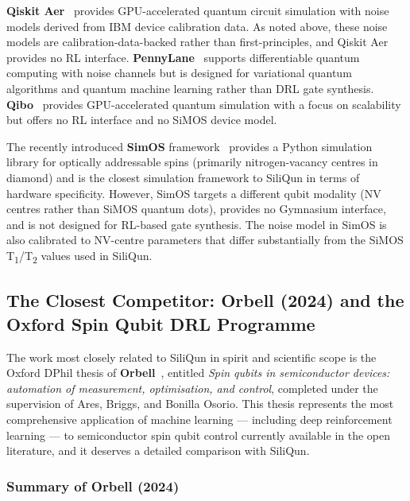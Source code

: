 \textbf{Qiskit Aer}~\cite{Qiskit2024} provides GPU-accelerated quantum
circuit simulation with noise models derived from IBM device calibration
data. As noted above, these noise models are calibration-data-backed rather
than first-principles, and Qiskit Aer provides no RL interface.
\textbf{PennyLane}~\cite{Bergholm2018} supports differentiable quantum
computing with noise channels but is designed for variational quantum
algorithms and quantum machine learning rather than DRL gate synthesis.
\textbf{Qibo}~\cite{Efthymiou2021} provides GPU-accelerated quantum
simulation with a focus on scalability but offers no RL interface and no
SiMOS device model.

The recently introduced \textbf{SimOS} framework~\cite{SimOS2025} provides
a Python simulation library for optically addressable spins (primarily
nitrogen-vacancy centres in diamond) and is the closest simulation
framework to SiliQun in terms of hardware specificity. However, SimOS
targets a different qubit modality (NV centres rather than SiMOS quantum
dots), provides no Gymnasium interface, and is not designed for RL-based
gate synthesis. The noise model in SimOS is also calibrated to NV-centre
parameters that differ substantially from the SiMOS T\textsubscript{1}/T\textsubscript{2}
values used in SiliQun.

\subsection{The Closest Competitor: Orbell (2024) and the Oxford Spin Qubit DRL Programme}
\label{sec:rw_oxford}

The work most closely related to SiliQun in spirit and scientific scope is
the Oxford DPhil thesis of \textbf{Orbell}~\cite{Orbell2024}, entitled
\emph{Spin qubits in semiconductor devices: automation of measurement,
optimisation, and control}, completed under the supervision of Ares,
Briggs, and Bonilla Osorio. This thesis represents the most comprehensive
application of machine learning — including deep reinforcement learning —
to semiconductor spin qubit control currently available in the open
literature, and it deserves a detailed comparison with SiliQun.

\subsubsection{Summary of Orbell (2024)}

